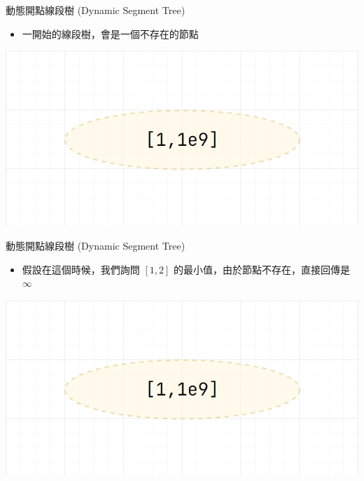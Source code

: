 \documentclass[aspectratio=169]{beamer}
\begin{document}
    \begin{frame}{動態開點線段樹 (Dynamic Segment Tree)}
        \begin{itemize}
            \item 一開始的線段樹，會是一個不存在的節點
        \end{itemize}
        \begin{center}
            \includegraphics[scale=0.4]{dynamic/initial.png}
        \end{center}
    \end{frame}

    \begin{frame}{動態開點線段樹 (Dynamic Segment Tree)}
        \begin{itemize}
            \item 假設在這個時候，我們詢問 $[1,2]$ 的最小值，由於節點不存在，直接回傳是 $\infty$
        \end{itemize}
        \begin{center}
            \includegraphics[scale=0.4]{dynamic/initial.png}
        \end{center}
    \end{frame}
\end{document}
